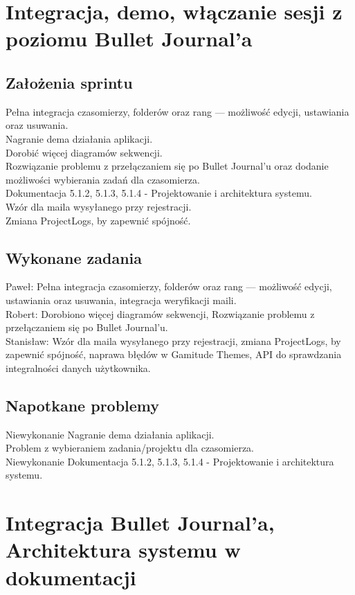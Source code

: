 \documentclass[a4paper,11pt]{report}
\begin{document}
\section {Integracja, demo, włączanie sesji z poziomu Bullet Journal’a}
\subsection {Założenia sprintu}
Pełna integracja czasomierzy, folderów oraz rang — możliwość edycji, ustawiania oraz usuwania.\\
Nagranie dema działania aplikacji.\\
Dorobić więcej diagramów sekwencji.\\
Rozwiązanie problemu z przełączaniem się po Bullet Journal'u oraz dodanie możliwości wybierania zadań dla czasomierza.\\
Dokumentacja 5.1.2, 5.1.3, 5.1.4 - Projektowanie i architektura systemu.\\
Wzór dla maila wysyłanego przy rejestracji.\\
Zmiana ProjectLogs, by zapewnić spójność.\\
\subsection {Wykonane zadania}
Paweł: Pełna integracja czasomierzy, folderów oraz rang — możliwość edycji, ustawiania oraz usuwania, integracja weryfikacji maili.\\
Robert: Dorobiono więcej diagramów sekwencji, Rozwiązanie problemu z przełączaniem się po Bullet Journal'u.\\
Stanisław: Wzór dla maila wysyłanego przy rejestracji, zmiana ProjectLogs, by zapewnić spójność, naprawa błędów w Gamitude Themes, API do sprawdzania integralności danych użytkownika.\\
\subsection {Napotkane problemy}
Niewykonanie Nagranie dema działania aplikacji.\\
Problem z wybieraniem zadania/projektu dla czasomierza.\\ 
Niewykonanie Dokumentacja 5.1.2, 5.1.3, 5.1.4 - Projektowanie i architektura systemu.\\


\section {Integracja Bullet Journal’a, Architektura systemu w dokumentacji}
\label{sec:system_zarzadzania_zadaniami_w_dziennikach}
\end{document}
